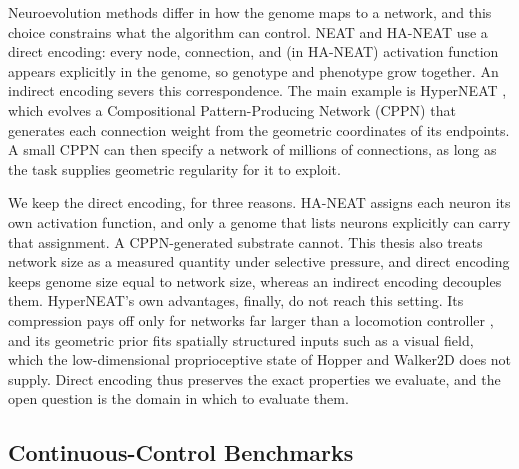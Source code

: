 \documentclass[12pt]{article}
\begin{document}

Neuroevolution methods differ in how the genome maps to a network, and this choice constrains what the algorithm can control.
NEAT and HA-NEAT use a direct encoding: every node, connection, and (in HA-NEAT) activation function appears explicitly in the genome, so genotype and phenotype grow together.
An indirect encoding severs this correspondence.
The main example is HyperNEAT \parencite{stanley_hypercubebased_2009}, which evolves a Compositional Pattern-Producing Network (CPPN) \parencite{stanley_compositional_2007} that generates each connection weight from the geometric coordinates of its endpoints.
A small CPPN can then specify a network of millions of connections, as long as the task supplies geometric regularity for it to exploit.

We keep the direct encoding, for three reasons.
HA-NEAT assigns each neuron its own activation function, and only a genome that lists neurons explicitly can carry that assignment. A CPPN-generated substrate cannot.
This thesis also treats network size as a measured quantity under selective pressure, and direct encoding keeps genome size equal to network size, whereas an indirect encoding decouples them.
HyperNEAT's own advantages, finally, do not reach this setting.
Its compression pays off only for networks far larger than a locomotion controller \parencite{stanley_hypercubebased_2009}, and its geometric prior fits spatially structured inputs such as a visual field, which the low-dimensional proprioceptive state of Hopper and Walker2D does not supply.
Direct encoding thus preserves the exact properties we evaluate, and the open question is the domain in which to evaluate them.

\subsection{Continuous-Control Benchmarks}
\label{subsec:control-benchmarks}
\end{document}
